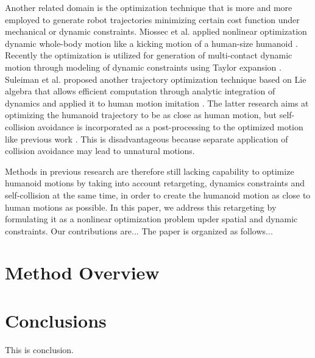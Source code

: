 \documentclass[letterpaper, 10 pt, conference]{ieeeconf}  %
\begin{document}
Another related domain is the optimization technique that is more and
more employed to generate robot trajectories minimizing certain cost
function under mechanical or dynamic constraints.
Miossec et al. applied nonlinear optimization dynamic whole-body motion
like a kicking motion of a human-size humanoid \cite{Miossec06ROBIO}.
Recently the optimization is utilized for generation of multi-contact
dynamic motion through modeling of dynamic constraints using Taylor
expansion \cite{Lengagne13IJRR}.
Suleiman et al. proposed another trajectory optimization technique
based on Lie 
algebra that allows efficient computation through analytic integration
of dynamics \cite{Suleiman07Humanoids} and applied it to human motion
imitation \cite{Suleiman08ICRA}. 
The latter research aims at optimizing the humanoid trajectory to be as
close as human motion, but self-collision avoidance is incorporated as
a post-processing to the optimized motion like previous work
\cite{Nakaoka12Humanoids}. This is disadvantageous 
because separate application of collision avoidance may lead to
unnatural motions. 


Methods in previous research are therefore still lacking 
capability to optimize humanoid motions by taking into account 
retargeting, dynamics constraints and
self-collision at the same time, in
order to create the humanoid motion as close to human motions as possible.
In this paper, we address this retargeting by formulating it
as a nonlinear optimization problem upder spatial and
dynamic constraints.
Our contributions are...
The paper is organized as follows...

\section{Method Overview}
\label{sec:overview}


\section{Conclusions}

This is conclusion.

\end{document}
